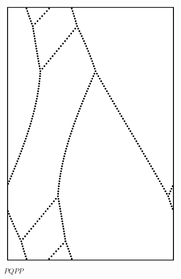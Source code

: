 \documentclass[12pt,twoside]{reedthesis}
\theoremstyle{definition}
\begin{document}
\begin{figure}[b!]
\begin{subfigure}[t]{0.24\textwidth}
    \includegraphics[width=\textwidth]{figures/string_cheese_appendix/pqpp.pdf}
    \caption*{$PQPP$}
    \vspace{5mm}
  \end{subfigure}
  \hfill
  \begin{subfigure}[t]{0.24\textwidth}

\end{subfigure}
\end{figure}
\end{document}
